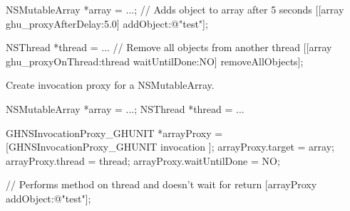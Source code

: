 \begin{DoxyCode}
 NSMutableArray *array = ...; 
 // Adds object to array after 5 seconds
 [[array ghu_proxyAfterDelay:5.0] addObject:@"test"];
 
 
 NSThread *thread = ...
 // Remove all objects from another thread
 [[array ghu_proxyOnThread:thread waitUntilDone:NO] removeAllObjects];
\end{DoxyCode}


\-Create invocation proxy for a \-N\-S\-Mutable\-Array.


\begin{DoxyCode}
 NSMutableArray *array = ...;
 NSThread *thread = ...
 
 GHNSInvocationProxy_GHUNIT *arrayProxy = [GHNSInvocationProxy_GHUNIT invocation
      ];
 arrayProxy.target = array;
 arrayProxy.thread = thread;
 arrayProxy.waitUntilDone = NO;

 // Performs method on thread and doesn't wait for return
 [arrayProxy addObject:@"test"];
\end{DoxyCode}
 


